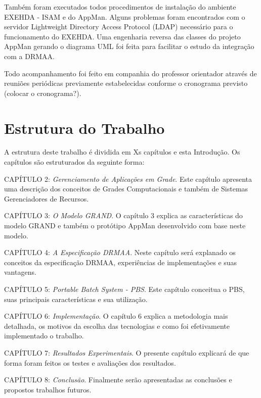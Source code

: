 Também foram executados todos procedimentos de instalação do ambiente EXEHDA - ISAM e do AppMan. Alguns problemas foram encontrados com o servidor Lightweight Directory Access Protocol (LDAP) necessário para o funcionamento do EXEHDA. Uma engenharia reversa das classes do projeto AppMan gerando o diagrama UML foi feita para facilitar o estudo da integração com a DRMAA.

Todo acompanhamento foi feito em companhia do professor orientador através de reuniões periódicas previamente estabelecidas conforme o cronograma previsto (colocar o cronograma?).

\section{Estrutura do Trabalho}
A estrutura deste trabalho é dividida em Xs capítulos e esta Introdução. Os capítulos são estruturados da seguinte forma:

CAPÍTULO 2: \emph{Gerenciamento de Aplicações em Grade}. Este capítulo apresenta uma descrição dos conceitos de Grades Computacionais e também de Sistemas Gerenciadores de Recursos.

CAPÍTULO 3: \emph{O Modelo GRAND}. O capítulo 3 explica as características do modelo GRAND e também o protótipo AppMan desenvolvido com base neste modelo.

CAPÍTULO 4: \emph{A Especificação DRMAA}. Neste capítulo será explanado os conceitos da especificação DRMAA, experiências de implementações e suas vantagens.

CAPÍTULO 5: \emph{Portable Batch System - PBS}. Este capítulo conceitua o PBS, suas principais características e sua utilização. 

CAPÍTULO 6: \emph{Implementação}. O capítulo 6 explica a metodologia mais detalhada, os motivos da escolha das tecnologias e como foi efetivamente implementado o trabalho.

CAPÍTULO 7: \emph{Resultados Experimentais}. O presente capítulo explicará de que forma foram feitos os testes e avaliações dos resultados.

CAPÍTULO 8: \emph{Conclusão}. Finalmente serão apresentadas as conclusões e propostos trabalhos futuros.